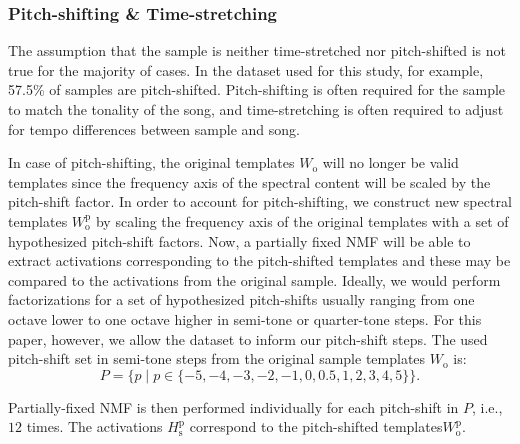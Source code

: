 \documentclass{article}
\begin{document}
\subsubsection{Pitch-shifting \& Time-stretching}
The assumption that the sample is neither time-stretched nor pitch-shifted is not true for the majority of cases. In the dataset used for this study, for example, 57.5\% of samples are pitch-shifted. Pitch-shifting is often required for the sample to match the tonality of the song, and time-stretching is often required to adjust for tempo differences between sample and song.


In case of pitch-shifting, the original templates $W_{\mathrm{o}}$ will no longer be valid templates since the frequency axis of the spectral content will be scaled by the pitch-shift factor. In order to account for pitch-shifting, we construct new spectral templates $W_{\mathrm{o}}^{\mathrm{p}}$ by scaling the frequency axis of the original templates with a set of hypothesized pitch-shift factors. Now, a partially fixed NMF will be able to extract activations corresponding to the pitch-shifted templates and these may be compared to the activations from the original sample. Ideally, we would perform factorizations for a set of hypothesized pitch-shifts usually ranging from one octave lower to one octave higher in semi-tone or quarter-tone steps. For this paper, however, we allow the dataset to inform our pitch-shift steps. The used pitch-shift set in semi-tone steps from the original sample templates $W_\mathrm{o}$ is: 
\[ P = \{p \mid p \in \{-5,-4,-3,-2,-1,0,0.5,1,2,3,4,5\}\}.\]

Partially-fixed NMF is then performed individually for each pitch-shift in $P$, i.e., $12$ times. The activations $H_{\mathrm{s}}^{\mathrm{p}}$ correspond to the pitch-shifted templates$W_{\mathrm{o}}^{\mathrm{p}}$.
\end{document}
